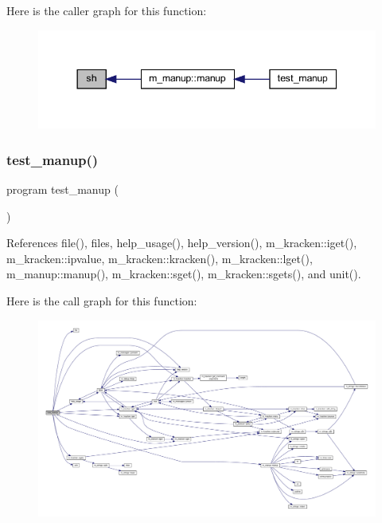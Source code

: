 Here is the caller graph for this function\+:
\nopagebreak
\begin{figure}[H]
\begin{center}
\leavevmode
\includegraphics[width=344pt]{manup_8f90_ae720ba239fabc9a2eefd18acea10cc90_icgraph}
\end{center}
\end{figure}
\mbox{\label{manup_8f90_a5941828c1341a0298a7b0c0c5789ff35}} 
\subsubsection{\texorpdfstring{test\+\_\+manup()}{test\_manup()}}
{\footnotesize\ttfamily program test\+\_\+manup (\begin{DoxyParamCaption}{ }\end{DoxyParamCaption})}



References file(), files, help\+\_\+usage(), help\+\_\+version(), m\+\_\+kracken\+::iget(), m\+\_\+kracken\+::ipvalue, m\+\_\+kracken\+::kracken(), m\+\_\+kracken\+::lget(), m\+\_\+manup\+::manup(), m\+\_\+kracken\+::sget(), m\+\_\+kracken\+::sgets(), and unit().

Here is the call graph for this function\+:
\nopagebreak
\begin{figure}[H]
\begin{center}
\leavevmode
\includegraphics[width=350pt]{manup_8f90_a5941828c1341a0298a7b0c0c5789ff35_cgraph}
\end{center}
\end{figure}
\mbox{\label{manup_8f90_ad056917b9c1db52352c327beadced6d0}} 
